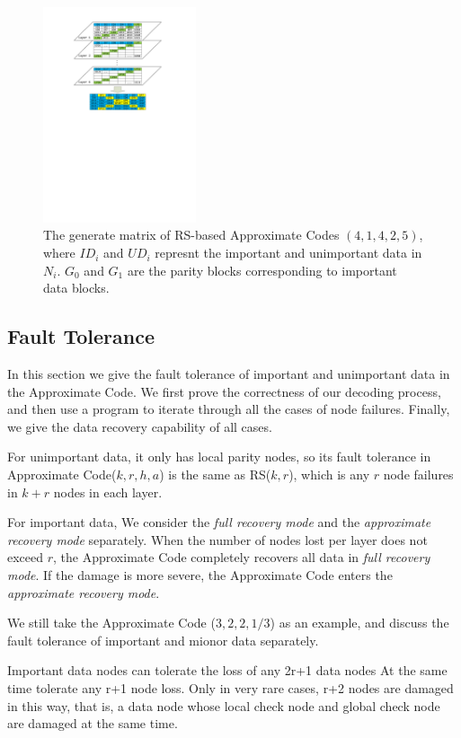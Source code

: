 \documentclass[sigconf]{acmart}
\begin{document}
\begin{figure}[h]
\centering
\includegraphics[width=0.4\textwidth]{photo/AP-TIP.pdf}
\caption{The generate matrix of RS-based Approximate Codes $(4,1,4,2,5)$, where $ID_i$ and $UD_i$ represnt the important and unimportant data in $N_i$. $G_0$ and $G_1$ are the parity blocks corresponding to important data blocks.}
\label{fig-ap-TIP}
\end{figure}



\iffalse
\subsection{Fault Tolerance}
In this section we give the fault tolerance of important and unimportant data in the Approximate Code.
We first prove the correctness of our decoding process, and then use a program to 
iterate through all the cases of node failures. Finally, we give the data recovery capability of all cases.

For unimportant data, it only has local parity nodes, so its fault tolerance in Approximate Code($k,r,h,a$) is the same as RS($k,r$), which is any $r$ node failures in $k+r$ nodes in each layer.

For important data, We consider the \emph{full recovery mode} and the \emph{approximate recovery mode} separately. When the number of nodes lost per layer does not exceed $r$, the Approximate Code completely recovers all data in \emph{full recovery mode}. If the damage is more severe, the Approximate Code enters the \emph{approximate recovery mode}.


We still take the Approximate Code ($3, 2, 2, 1/3$) as an example, and discuss the fault tolerance of important and mionor data separately.


Important data nodes can tolerate the loss of any 2r+1 data nodes
At the same time tolerate any r+1 node loss. Only in very rare cases, r+2 nodes are damaged in this way, that is, a data node whose local check node and global check node are damaged at the same time.
\end{document}
